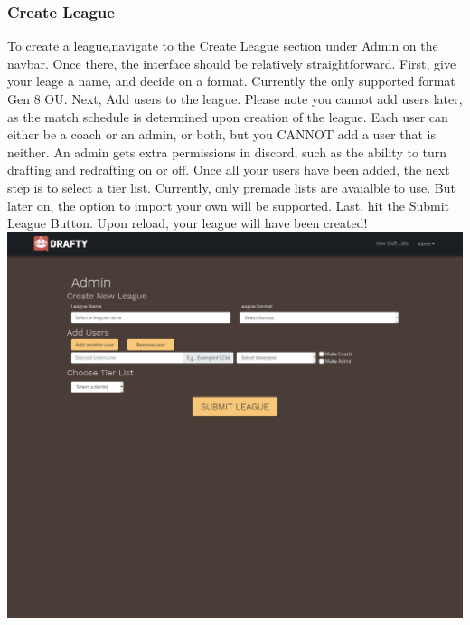 \documentclass{article}
\begin{document}
  \subsubsection*{Create League}
  To create a league,navigate to the Create League section under Admin on the navbar. Once there, the interface should be relatively straightforward. 
  First, give your leage a name, and decide on a format. Currently the only supported format Gen 8 OU. Next, Add users to the league. 
  Please note you cannot add users later, as the match schedule is determined upon creation of the league. 
  Each user can either be a coach or an admin, or both, but you CANNOT add a user that is neither. 
  An admin gets extra permissions in discord, such as the ability to turn drafting and redrafting on or off.
  Once all your users have been added, the next step is to select a tier list. 
  Currently, only premade lists are avaialble to use. But later on, the option to import your own will be supported.
  Last, hit the Submit League Button. Upon reload, your league will have been created!\\
  \includegraphics[scale=.3]{create_league.png}
\end{document}
